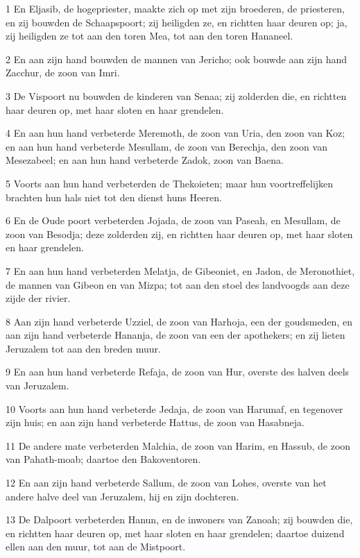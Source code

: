 \par 1 En Eljasib, de hogepriester, maakte zich op met zijn broederen, de priesteren, en zij bouwden de Schaapspoort; zij heiligden ze, en richtten haar deuren op; ja, zij heiligden ze tot aan den toren Mea, tot aan den toren Hananeel.
\par 2 En aan zijn hand bouwden de mannen van Jericho; ook bouwde aan zijn hand Zacchur, de zoon van Imri.
\par 3 De Vispoort nu bouwden de kinderen van Senaa; zij zolderden die, en richtten haar deuren op, met haar sloten en haar grendelen.
\par 4 En aan hun hand verbeterde Meremoth, de zoon van Uria, den zoon van Koz; en aan hun hand verbeterde Mesullam, de zoon van Berechja, den zoon van Mesezabeel; en aan hun hand verbeterde Zadok, zoon van Baena.
\par 5 Voorts aan hun hand verbeterden de Thekoieten; maar hun voortreffelijken brachten hun hals niet tot den dienst huns Heeren.
\par 6 En de Oude poort verbeterden Jojada, de zoon van Paseah, en Mesullam, de zoon van Besodja; deze zolderden zij, en richtten haar deuren op, met haar sloten en haar grendelen.
\par 7 En aan hun hand verbeterden Melatja, de Gibeoniet, en Jadon, de Meronothiet, de mannen van Gibeon en van Mizpa; tot aan den stoel des landvoogds aan deze zijde der rivier.
\par 8 Aan zijn hand verbeterde Uzziel, de zoon van Harhoja, een der goudsmeden, en aan zijn hand verbeterde Hananja, de zoon van een der apothekers; en zij lieten Jeruzalem tot aan den breden muur.
\par 9 En aan hun hand verbeterde Refaja, de zoon van Hur, overste des halven deels van Jeruzalem.
\par 10 Voorts aan hun hand verbeterde Jedaja, de zoon van Harumaf, en tegenover zijn huis; en aan zijn hand verbeterde Hattus, de zoon van Hasabneja.
\par 11 De andere mate verbeterden Malchia, de zoon van Harim, en Hassub, de zoon van Pahath-moab; daartoe den Bakoventoren.
\par 12 En aan zijn hand verbeterde Sallum, de zoon van Lohes, overste van het andere halve deel van Jeruzalem, hij en zijn dochteren.
\par 13 De Dalpoort verbeterden Hanun, en de inwoners van Zanoah; zij bouwden die, en richtten haar deuren op, met haar sloten en haar grendelen; daartoe duizend ellen aan den muur, tot aan de Mistpoort.
